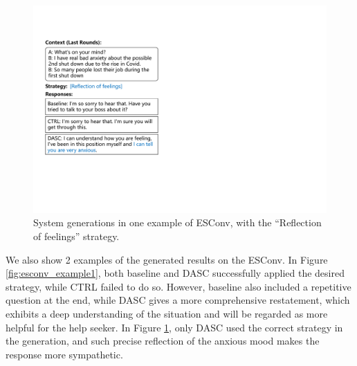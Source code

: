 \begin{figure}[htbp]
    \centering
    \includegraphics[width=1.0\columnwidth]{figures/esconv_example2.pdf}
    \caption{System generations in one example of ESConv, with the ``Reflection of feelings'' strategy.}
    \label{fig:esconv_example2}
\end{figure}

We also show 2 examples of the generated results on the ESConv. In Figure \ref{fig:esconv_example1}, both baseline and DASC successfully applied the desired strategy, while CTRL failed to do so. However, baseline also included a repetitive question at the end, while DASC gives a more comprehensive restatement, which exhibits a deep understanding of the situation and will be regarded as more helpful for the help seeker. In Figure \ref{fig:esconv_example2}, only DASC used the correct strategy in the generation, and such precise reflection of the anxious mood makes the response more sympathetic.